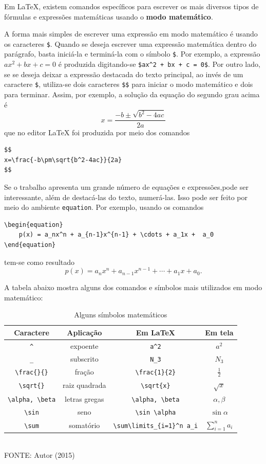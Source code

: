 Em LaTeX, existem comandos específicos para escrever os mais diversos tipos de fórmulas e expressões matemáticas usando o \textbf{modo matemático}.

A forma mais simples de escrever uma expressão em modo matemático é usando os caracteres \verb!$!. Quando se deseja escrever uma expressão matemática dentro do parágrafo, basta iniciá-la e terminá-la com o símbolo \verb!$!. Por exemplo, a expressão $ax^2 + bx + c = 0$ é produzida digitando-se \verb!$ax^2 + bx + c = 0$!. Por outro lado, se se deseja deixar a expressão destacada do texto principal, ao invés de um caractere \verb!$!, utiliza-se dois caracteres \verb!$$! para iniciar o modo matemático e dois para terminar. Assim, por exemplo, a solução da equação do segundo grau acima é
$$
x=\frac{-b\pm\sqrt{b^2-4ac}}{2a}
$$
que no editor LaTeX foi produzida por meio dos comandos
\begin{verbatim}
$$
x=\frac{-b\pm\sqrt{b^2-4ac}}{2a}
$$
\end{verbatim}

Se o trabalho apresenta um grande número de equações e expressões,pode ser interessante, além de destacá-las do texto, numerá-las. Isso pode ser feito por meio do ambiente \texttt{equation}. Por exemplo, usando os comandos
\begin{verbatim}
\begin{equation}
	p(x) = a_nx^n + a_{n-1}x^{n-1} + \cdots + a_1x +  a_0
\end{equation}
\end{verbatim}
tem-se como resultado
\begin{equation}
	p(x) = a_nx^n + a_{n-1}x^{n-1} + \cdots + a_1x + a_0.
\end{equation}

A tabela abaixo mostra alguns dos comandos e símbolos mais utilizados em modo matemático:
\begin{table}[H]
\begin{center}
\caption{Alguns símbolos matemáticos}
\begin{tabular}{c c c c}
\hline
Caractere & Aplicação & Em LaTeX & Em tela\\
\hline
\hline
\verb!^! & expoente & \verb!a^2! & $a^2$\\
\verb!_! & subscrito & \verb!N_3! & $N_3$\\
\verb!\frac{}{}! & fração & \verb!\frac{1}{2}! & $\frac{1}{2}$\\
\verb!\sqrt{}! & raiz quadrada & \verb!\sqrt{x}! & $\sqrt{x}$\\
\verb!\alpha, \beta! & letras gregas & \verb!\alpha, \beta! & $\alpha, \beta$\\
\verb!\sin! & seno & \verb!\sin \alpha! & $\sin \alpha$\\
\verb!\sum! & somatório & \verb!\sum\limits_{i=1}^n a_i! & $\sum\limits_{i=1}^n a_i$\\
\hline
\end{tabular}\\ \vspace{0.25cm}
FONTE: Autor (2015)
\end{center}
\end{table}

